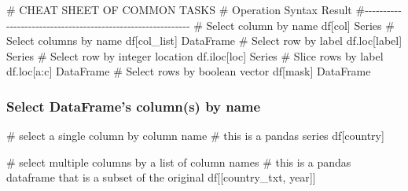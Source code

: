 \documentclass[
  letterpaper,
  DIV=11,
  numbers=noendperiod]{scrreprt}
\newenvironment{Shaded}{\begin{snugshade}}{\end{snugshade}}
\newcommand{\CommentTok}[1]{\textcolor[rgb]{0.37,0.37,0.37}{#1}}
\newcommand{\NormalTok}[1]{\textcolor[rgb]{0.00,0.23,0.31}{#1}}
\newcommand{\StringTok}[1]{\textcolor[rgb]{0.13,0.47,0.30}{#1}}
\begin{document}
\begin{Shaded}
\begin{Highlighting}[]
\CommentTok{\# CHEAT SHEET OF COMMON TASKS}
\CommentTok{\# Operation                       Syntax           Result}
\CommentTok{\#{-}{-}{-}{-}{-}{-}{-}{-}{-}{-}{-}{-}{-}{-}{-}{-}{-}{-}{-}{-}{-}{-}{-}{-}{-}{-}{-}{-}{-}{-}{-}{-}{-}{-}{-}{-}{-}{-}{-}{-}{-}{-}{-}{-}{-}{-}{-}{-}{-}{-}{-}{-}{-}{-}{-}{-}{-}{-}{-}{-}}
\CommentTok{\# Select column by name           df[col]          Series}
\CommentTok{\# Select columns by name          df[col\_list]     DataFrame}
\CommentTok{\# Select row by label             df.loc[label]    Series}
\CommentTok{\# Select row by integer location  df.iloc[loc]     Series}
\CommentTok{\# Slice rows by label             df.loc[a:c]      DataFrame}
\CommentTok{\# Select rows by boolean vector   df[mask]         DataFrame}
\end{Highlighting}
\end{Shaded}

\subsubsection{Select DataFrame's column(s) by
name}\label{select-dataframes-columns-by-name}

\begin{Shaded}
\begin{Highlighting}[]
\CommentTok{\# select a single column by column name}
\CommentTok{\# this is a pandas series}
\NormalTok{df[}\StringTok{\textquotesingle{}country\textquotesingle{}}\NormalTok{]}
\end{Highlighting}
\end{Shaded}

\begin{Shaded}
\begin{Highlighting}[]
\CommentTok{\# select multiple columns by a list of column names}
\CommentTok{\# this is a pandas dataframe that is a subset of the original}
\NormalTok{df[[}\StringTok{\textquotesingle{}country\_txt\textquotesingle{}}\NormalTok{, }\StringTok{\textquotesingle{}year\textquotesingle{}}\NormalTok{]]}
\end{Highlighting}
\end{Shaded}
\end{document}
